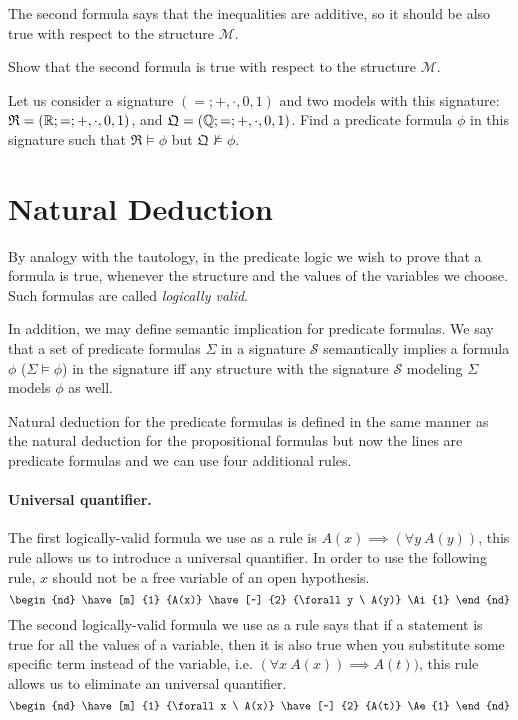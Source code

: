 The second formula says that the inequalities are additive, so it should be also
true with respect to the structure $\mathcal{M}$.
\begin{exercise}
  Show that the second formula is true with respect to the structure
  $\mathcal{M}$.
\end{exercise}

\begin{exercise}
  Let us consider a signature $(=; +, \cdot, 0, 1)$ and two models with this
  signature: $\mathfrak{R} = (\mathbb{R}; =; +, \cdot, 0, 1)$, and
  $\mathfrak{Q} = (\mathbb{Q}; =; +, \cdot, 0, 1)$.
  Find a predicate formula $\phi$ in this signature such that
  $\mathfrak{R} \models \phi$ but $\mathfrak{Q} \not\models \phi$.
\end{exercise}


\section{Natural Deduction}
By analogy with the tautology, in the predicate logic we wish to prove that a
formula is true, whenever the structure and the values of the variables we
choose. Such formulas are called \textit{logically valid}.

In addition, we may define semantic implication for predicate formulas.
We say that a set of predicate formulas $\Sigma$ in a signature $\mathcal{S}$
semantically implies a formula $\phi$ ($\Sigma \models \phi$) in the signature
iff any structure with the signature $\mathcal{S}$ modeling $\Sigma$ models
$\phi$ as well.

Natural deduction for the predicate formulas is defined in the same manner as
the natural deduction for the propositional formulas but now the lines are
predicate formulas and we can use four additional rules.

\paragraph{Universal quantifier.}
The first logically-valid formula we use as a rule is
$A(x) \implies (\forall y \ A(y))$,
this rule allows us to introduce a universal quantifier.
In order to use the following rule, $x$ should not be a free variable of
an open hypothesis.
\[
  \begin{nd}
    \have [m] {1} {A(x)}
    \have [~] {2} {\forall y \  A(y)} \Ai{1}
  \end{nd}
\]
The second logically-valid formula we use as a rule says that if a statement is
true for all the values of a variable, then it is also true when you substitute
some specific term instead of the variable, i.e. $(\forall x \ A(x)) \implies
A(t))$, this rule allows us to eliminate an universal quantifier.
\[
  \begin{nd}
    \have [m] {1} {\forall x \  A(x)}
    \have [~] {2} {A(t)} \Ae{1}
  \end{nd}
\]

